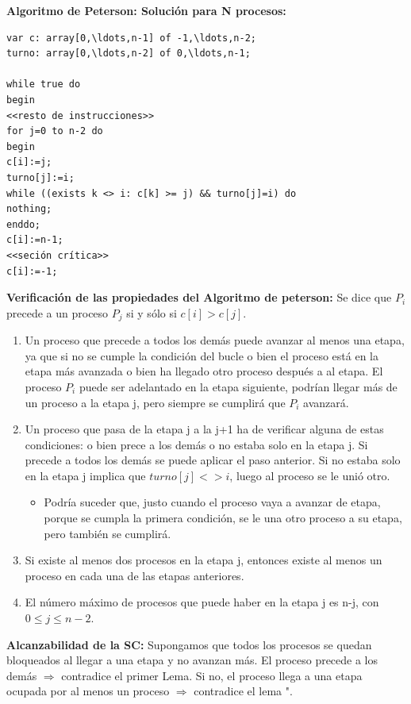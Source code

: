 \documentclass[a4paper,11pt]{article}
\begin{document}
\textbf{Algoritmo de Peterson: Solución para N procesos:}

\begin{verbatim}
var c: array[0,\ldots,n-1] of -1,\ldots,n-2;
turno: array[0,\ldots,n-2] of 0,\ldots,n-1;

while true do
begin 
<<resto de instrucciones>>
for j=0 to n-2 do
begin
c[i]:=j;
turno[j]:=i;
while ((exists k <> i: c[k] >= j) && turno[j]=i) do
nothing;
enddo;
c[i]:=n-1;
<<seción crítica>>
c[i]:=-1;
\end{verbatim}

\textbf{Verificación de las propiedades del Algoritmo de peterson:}
Se dice que $P_i$ precede a un proceso $P_j$ si y sólo si $c[i] > c[j]$. 

\begin{enumerate}
\item Un proceso que precede a todos los demás puede avanzar al menos una etapa, ya que si no se cumple la condición del bucle o bien el proceso está en la etapa más avanzada o bien ha llegado otro proceso después a al etapa. El proceso $P_i$ puede ser adelantado en la etapa siguiente, podrían llegar más de un proceso a la etapa j, pero siempre se cumplirá que $P_i$ avanzará.

\item Un proceso que pasa de la etapa j a la j+1 ha de verificar alguna de estas condiciones: o bien prece a los demás o no estaba solo en la etapa j. Si precede a todos los demás se puede aplicar el paso anterior. Si no estaba solo en la etapa j implica que $turno[j] <> i$, luego al proceso se le unió otro.

	\begin{itemize}
		\item Podría suceder que, justo cuando el proceso vaya a avanzar de etapa, porque se cumpla la primera condición, se le una otro proceso a su etapa, pero también se cumplirá.
	\end{itemize}
	
\item Si existe al menos dos procesos en la etapa j, entonces existe al menos un proceso en cada una de las etapas anteriores. 

\item El número máximo de procesos que puede haber en la etapa j es n-j, con $0\leq j \leq n-2$. 
\end{enumerate}

\textbf{Alcanzabilidad de la SC:} Supongamos que todos los procesos se quedan bloqueados al llegar a una etapa y no avanzan más. El proceso precede a los demás $\Rightarrow$ contradice el primer Lema. Si no, el proceso llega a una etapa ocupada por al menos un proceso $\Rightarrow$ contradice el lema ". \\
\end{document}
